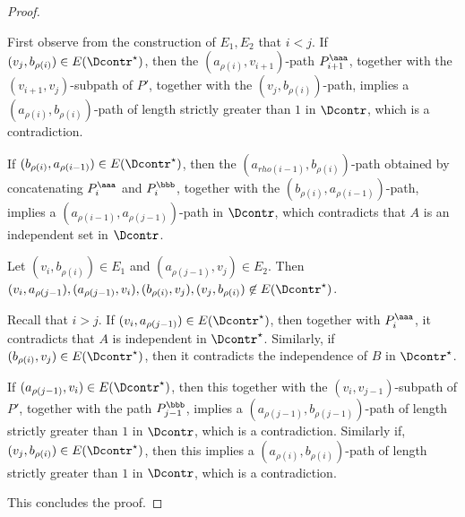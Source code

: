 \begin{proof}
\begin{claimproof}
First observe from the construction of $E_1,E_2$ that $i <j$.
If $(v_j,b_{\rho(i)}) \in E(\Dcontr^{\star})$, then the $(a_{\rho(i)},v_{i+1})$-path $P^{\aaa}_{i+1}$, together with the $(v_{i+1},v_j)$-subpath of $P'$, together with the $(v_j,b_{\rho(i)})$-path, implies a $(a_{\rho(i)},b_{\rho(i)})$-path of length strictly greater than $1$ in $\Dcontr$, which is a contradiction. 

If $(b_{\rho(i)},a_{\rho(i-1)})  \in E(\Dcontr^{\star})$, then the $(a_{rho(i-1)},b_{\rho(i)})$-path obtained by concatenating $P^{\aaa}_i$ and $P^{\bbb}_i$, together with the $(b_{\rho(i)},a_{\rho(i-1)})$-path, implies a $(a_{\rho(i-1)},a_{\rho(j-1)})$-path in $\Dcontr$, which contradicts that $A$ is an independent set in $\Dcontr$.
\end{claimproof}

\begin{claim}\label{claim:biclique-long-path-strong}
Let $(v_i,b_{\rho(i)}) \in E_1$ and $(a_{\rho(j-1)},v_j) \in E_2$.
Then $(v_i,a_{\rho(j-1}), \allowbreak (a_{\rho(j-1)},v_i), \allowbreak (b_{\rho(i)},v_j), \allowbreak (v_j,b_{\rho(i)}) \not \in E(\Dcontr^{\star})$.
\end{claim}

\begin{claimproof}
Recall that $i >j$.
If $(v_i,a_{\rho(j-1)}) \in E(\Dcontr^{\star})$, then together with $P^{\aaa}_i$, it contradicts that $A$ is independent in $\Dcontr^{\star}$. Similarly, if $(b_{\rho(i)},v_j) \in E(\Dcontr^{\star})$, then it contradicts the independence of $B$ in $\Dcontr^{\star}$.

If $(a_{\rho(j-1)},v_i) \in E(\Dcontr^{\star})$, then this together with the $(v_i,v_{j-1})$-subpath of $P'$, together with the path $P^{\bbb}_{j-1}$, implies a $(a_{\rho(j-1)},b_{\rho(j-1)})$-path of length strictly greater than $1$ in $\Dcontr$, which is a contradiction. Similarly if, $(v_j,b_{\rho(i)}) \in E(\Dcontr^{\star})$, then this implies a $(a_{\rho(i)},b_{\rho(i)})$-path of length strictly greater than $1$ in $\Dcontr$, which is a contradiction.
\end{claimproof}
This concludes the proof.
\end{proof}